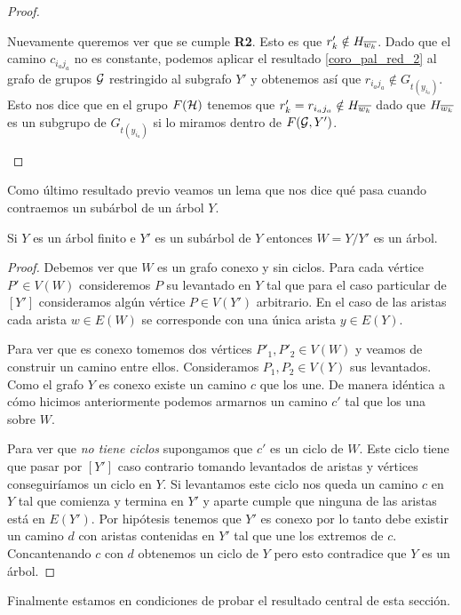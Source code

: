 \documentclass[tesis.tex]{subfiles}
\begin{document}
\begin{proof}
\begin{enumerate}[i)]
		Nuevamente queremos ver que se cumple \textbf{R2}. 
		Esto es que $r'_k \notin H_{\overline{w_k}}$.		
		Dado que el camino $c_{i_aj_a}$ no es constante, podemos aplicar el resultado \ref{coro_pal_red_2} al grafo de grupos ${\cal G}$ restringido al subgrafo $Y'$ y obtenemos así que $r_{i_aj_a} \notin G_{t(y_{i_a})}$.
		Esto nos dice que en el grupo $F({\cal H})$ tenemos que $r'_{k} = r_{i_aj_a} \notin H_{\overline{w_k}}$ dado que $H_{\overline{w_k}}$ es un subgrupo de $G_{t(y_{i_a})}$ si lo miramos dentro de $F({\cal G}, Y')$. 
	\end{enumerate}	
\end{proof}

Como último resultado previo veamos un lema que nos dice qué pasa cuando contraemos un subárbol de un árbol $Y$.

\begin{lema}\label{lema_subarbol_conexo}
	Si $Y$ es un árbol finito e $Y'$ es un subárbol de $Y$ entonces $W=Y/Y'$ es un árbol. 
\end{lema} 
\begin{proof}
	Debemos ver que $W$ es un grafo conexo y sin ciclos.
	Para cada vértice $P' \in V(W)$ consideremos $P$ su levantado en $Y$ tal que para el caso particular de $[Y']$ consideramos algún vértice $P \in V(Y')$ arbitrario.
	En el caso de las aristas cada arista $w \in E(W)$ se corresponde con una única arista $y \in E(Y)$.
	
	Para ver que es conexo tomemos dos vértices $P'_1,P'_2 \in V(W)$ y veamos de construir un camino entre ellos.
	Consideramos $P_{1}, P_{2} \in V(Y)$ sus levantados.
	Como el grafo $Y$ es conexo existe un camino $c$ que los une.
	De manera idéntica a cómo hicimos anteriormente podemos armarnos un camino $c'$ tal que los una sobre $W$.
	
	Para ver que \textit{no tiene ciclos} supongamos que $c'$ es un ciclo de $W$.
	Este ciclo tiene que pasar por $[Y']$ caso contrario tomando levantados de aristas y vértices conseguiríamos un ciclo en $Y$.
	Si levantamos este ciclo nos queda un camino $c$ en $Y$ tal que comienza y termina en $Y'$ y aparte cumple que ninguna de las aristas está en $E(Y')$.
	Por hipótesis tenemos que $Y'$ es conexo por lo tanto debe existir un camino $d$ con aristas contenidas en $Y'$ tal que une los extremos de $c$. 
	Concantenando $c$ con $d$ obtenemos un ciclo de $Y$ pero esto contradice que $Y$ es un árbol.
	
\end{proof}


Finalmente estamos en condiciones de probar el resultado central de esta sección. 
\end{document}
